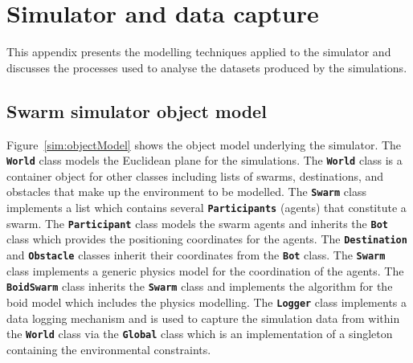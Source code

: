 \chapter{Simulator and data capture}\label{app5}

This appendix presents the modelling techniques applied to the simulator and discusses the processes used to analyse the datasets produced by the simulations.

\section{Swarm simulator object model}\label{sim:Simulator3}
Figure~\ref{sim:objectModel} shows the object model underlying the simulator. The \texttt{\textbf{World}} class models the Euclidean plane for the simulations. The \texttt{\textbf{World}} class is a container object for other classes including lists of swarms, destinations, and obstacles that make up the environment to be modelled. The \texttt{\textbf{Swarm}} class implements a list which contains several \texttt{\textbf{Participants}} (agents) that constitute a swarm. The \texttt{\textbf{Participant}} class models the swarm agents and inherits the \texttt{\textbf{Bot}} class which provides the positioning coordinates for the agents. The \texttt{\textbf{Destination}} and \texttt{\textbf{Obstacle}} classes inherit their coordinates from the \texttt{\textbf{Bot}} class. The \texttt{\textbf{Swarm}} class implements a generic physics model for the coordination of the agents. The \texttt{\textbf{BoidSwarm}} class inherits the \texttt{\textbf{Swarm}} class and implements the algorithm for the boid model which includes the physics modelling. The \texttt{\textbf{Logger}} class implements a data logging mechanism and is used to capture the simulation data from within the \texttt{\textbf{World}} class via the \texttt{\textbf{Global}} class which is an implementation of a singleton containing the environmental constraints.

